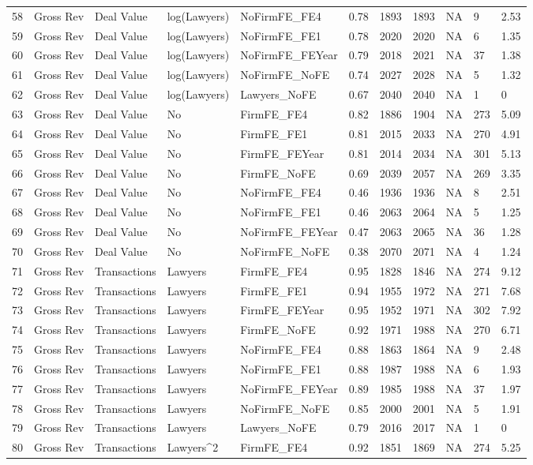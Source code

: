 \documentclass{article}
\begin{document}
\begin{table}[H]
\begin{tabular}{rllllllllll}
  58 & Gross Rev & Deal Value & log(Lawyers) & NoFirmFE\_FE4 & 0.78 & 1893 & 1893 & NA & 9 & 2.53 \\
  59 & Gross Rev & Deal Value & log(Lawyers) & NoFirmFE\_FE1 & 0.78 & 2020 & 2020 & NA & 6 & 1.35 \\
  60 & Gross Rev & Deal Value & log(Lawyers) & NoFirmFE\_FEYear & 0.79 & 2018 & 2021 & NA & 37 & 1.38 \\
  61 & Gross Rev & Deal Value & log(Lawyers) & NoFirmFE\_NoFE & 0.74 & 2027 & 2028 & NA & 5 & 1.32 \\
  62 & Gross Rev & Deal Value & log(Lawyers) & Lawyers\_NoFE & 0.67 & 2040 & 2040 & NA & 1 & 0 \\
  63 & Gross Rev & Deal Value & No & FirmFE\_FE4 & 0.82 & 1886 & 1904 & NA & 273 & 5.09 \\
  64 & Gross Rev & Deal Value & No & FirmFE\_FE1 & 0.81 & 2015 & 2033 & NA & 270 & 4.91 \\
  65 & Gross Rev & Deal Value & No & FirmFE\_FEYear & 0.81 & 2014 & 2034 & NA & 301 & 5.13 \\
  66 & Gross Rev & Deal Value & No & FirmFE\_NoFE & 0.69 & 2039 & 2057 & NA & 269 & 3.35 \\
  67 & Gross Rev & Deal Value & No & NoFirmFE\_FE4 & 0.46 & 1936 & 1936 & NA & 8 & 2.51 \\
  68 & Gross Rev & Deal Value & No & NoFirmFE\_FE1 & 0.46 & 2063 & 2064 & NA & 5 & 1.25 \\
  69 & Gross Rev & Deal Value & No & NoFirmFE\_FEYear & 0.47 & 2063 & 2065 & NA & 36 & 1.28 \\
  70 & Gross Rev & Deal Value & No & NoFirmFE\_NoFE & 0.38 & 2070 & 2071 & NA & 4 & 1.24 \\
  71 & Gross Rev & Transactions & Lawyers & FirmFE\_FE4 & 0.95 & 1828 & 1846 & NA & 274 & 9.12 \\
  72 & Gross Rev & Transactions & Lawyers & FirmFE\_FE1 & 0.94 & 1955 & 1972 & NA & 271 & 7.68 \\
  73 & Gross Rev & Transactions & Lawyers & FirmFE\_FEYear & 0.95 & 1952 & 1971 & NA & 302 & 7.92 \\
  74 & Gross Rev & Transactions & Lawyers & FirmFE\_NoFE & 0.92 & 1971 & 1988 & NA & 270 & 6.71 \\
  75 & Gross Rev & Transactions & Lawyers & NoFirmFE\_FE4 & 0.88 & 1863 & 1864 & NA & 9 & 2.48 \\
  76 & Gross Rev & Transactions & Lawyers & NoFirmFE\_FE1 & 0.88 & 1987 & 1988 & NA & 6 & 1.93 \\
  77 & Gross Rev & Transactions & Lawyers & NoFirmFE\_FEYear & 0.89 & 1985 & 1988 & NA & 37 & 1.97 \\
  78 & Gross Rev & Transactions & Lawyers & NoFirmFE\_NoFE & 0.85 & 2000 & 2001 & NA & 5 & 1.91 \\
  79 & Gross Rev & Transactions & Lawyers & Lawyers\_NoFE & 0.79 & 2016 & 2017 & NA & 1 & 0 \\
  80 & Gross Rev & Transactions & Lawyers^2 & FirmFE\_FE4 & 0.92 & 1851 & 1869 & NA & 274 & 5.25 \\
   \hline
\end{tabular}
\end{table}
\end{document}

